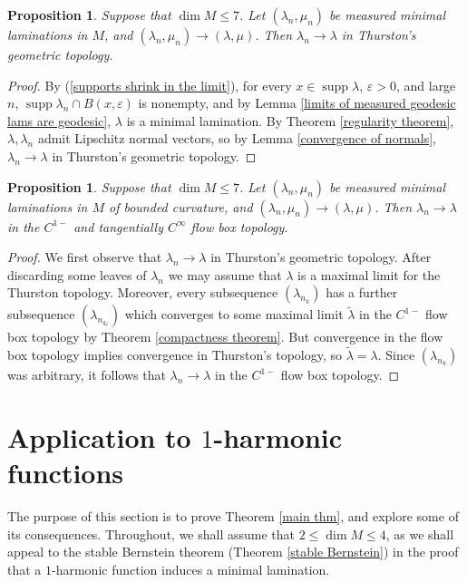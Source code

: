\documentclass[reqno,11pt]{amsart}
\DeclareMathOperator{\supp}{supp}
\newtheorem{proposition}[theorem]{Proposition}
\theoremstyle{definition}
\numberwithin{equation}{section}
\begin{document}
\begin{proposition}
Suppose that $\dim M \leq 7$.
Let $(\lambda_n, \mu_n)$ be measured minimal laminations in $M$, and $(\lambda_n, \mu_n) \to (\lambda, \mu)$.
Then $\lambda_n \to \lambda$ in Thurston's geometric topology.
\end{proposition}
\begin{proof}
By (\ref{supports shrink in the limit}), for every $x \in \supp \lambda$, $\varepsilon > 0$, and large $n$, $\supp \lambda_n \cap B(x, \varepsilon)$ is nonempty, and by Lemma \ref{limits of measured geodesic lams are geodesic}, $\lambda$ is a minimal lamination.
By Theorem \ref{regularity theorem}, $\lambda, \lambda_n$ admit Lipschitz normal vectors, so by Lemma \ref{convergence of normals}, $\lambda_n \to \lambda$ in Thurston's geometric topology.
\end{proof}

\begin{proposition}
Suppose that $\dim M \leq 7$.
Let $(\lambda_n, \mu_n)$ be measured minimal laminations in $M$ of bounded curvature, and $(\lambda_n, \mu_n) \to (\lambda, \mu)$.
Then $\lambda_n \to \lambda$ in the $C^{1-}$ and tangentially $C^\infty$ flow box topology.
\end{proposition}
\begin{proof}
We first observe that $\lambda_n \to \lambda$ in Thurston's geometric topology.
After discarding some leaves of $\lambda_n$ we may assume that $\lambda$ is a maximal limit for the Thurston topology.
Moreover, every subsequence $(\lambda_{n_k})$ has a further subsequence $(\lambda_{n_{k_\ell}})$ which converges to some maximal limit $\tilde \lambda$ in the $C^{1-}$ flow box topology by Theorem \ref{compactness theorem}.
But convergence in the flow box topology implies convergence in Thurston's topology, so $\tilde \lambda = \lambda$.
Since $(\lambda_{n_k})$ was arbitrary, it follows that $\lambda_n \to \lambda$ in the $C^{1-}$ flow box topology.
\end{proof}



\section{Application to \texorpdfstring{$1$-harmonic}{one-harmonic} functions}\label{1harmonic sec}
The purpose of this section is to prove Theorem \ref{main thm}, and explore some of its consequences.
Throughout, we shall assume that $2 \leq \dim M \leq 4$, as we shall appeal to the stable Bernstein theorem (Theorem \ref{stable Bernstein}) in the proof that a $1$-harmonic function induces a minimal lamination.
\end{document}
